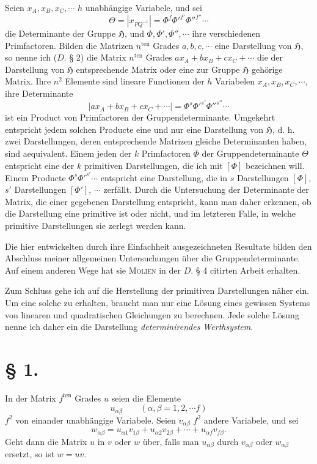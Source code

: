 \documentclass[11pt]{article}
\newcommand{\Hgr}{\mathfrak{H}}
\newcommand{\ten}{\mathrm{ten}}
\begin{document}
Seien $x_A,x_B,x_C,\cdots$ $h$ unabhängige Variabele, und sei
\[
\Theta=|x_{PQ^{-1}}|=\Phi^f{\Phi'}^{f'}{\Phi''}^{f''}\cdots
\]
die Determinante der Gruppe $\Hgr$, und $\Phi,\Phi',\Phi'',\cdots$ ihre verschiedenen Primfactoren. Bilden die Matrizen $n^{\ten}$ Grades $a,b,c,\cdots$ eine Darstellung von $\Hgr$, so nenne ich ($D.$ § 2) die Matrix $n^{\ten}$ Grades $ax_A+bx_B+cx_C+\cdots$ die der Darstellung von $\Hgr$ entsprechende Matrix oder eine zur Gruppe $\Hgr$ gehörige Matrix. Ihre $n^2$ Elemente sind lineare Functionen der $h$ Variabelen $x_A,x_B,x_C,\cdots$, ihre Determinante
\[
|ax_A+bx_B+cx_C+\cdots|=\Phi^s{\Phi'}^{s'}{\Phi''}^{s''}\cdots
\]
ist ein Product von Primfactoren der Gruppendeterminante. Umgekehrt entspricht jedem solchen Producte eine und nur eine Darstellung von $\Hgr$, d. h. zwei Darstellungen, deren entsprechende Matrizen gleiche Determinanten haben, sind aequivalent. Einem jeden der $k$ Primfactoren $\Phi$ der Gruppendeterminante $\Theta$ entspricht eine der $k$ primitiven Darstellungen, die ich mit $[\Phi]$ bezeichnen will. Einem Producte $\Phi^s{\Phi'}^{s'}\cdots$ entspricht eine Darstellung, die in $s$ Darstellungen $[\Phi]$, $s'$ Darstellungen $[\Phi']$, $\cdots$ zerfällt. Durch die Untersuchung der Determinante der Matrix, die einer gegebenen Darstellung entspricht, kann man daher erkennen, ob die Darstellung eine primitive ist oder nicht, und im letzteren Falle, in welche primitive Darstellungen sie zerlegt werden kann.

Die hier entwickelten durch ihre Einfachheit ausgezeichneten Resultate bilden den Abschluss meiner allgemeinen Untersuchungen über die Gruppendeterminante. Auf einem anderen Wege hat sie \textsc{Molien} in der $D.$ § 4 citirten Arbeit erhalten.

Zum Schluss gehe ich auf die Herstellung der primitiven Darstellungen näher ein. Um eine solche zu erhalten, braucht man nur eine Lösung eines gewissen Systems von linearen und quadratischen Gleichungen zu berechnen. Jede solche Lösung nenne ich daher ein die Darstellung \emph{determinirendes Werthsystem}.

\section*{§ 1.}

In der Matrix $f^{\ten}$ Grades $u$ seien die Elemente
\[
u_{\alpha\beta}\qquad(\alpha,\beta=1,2,\cdots f)
\]
$f^2$ von einander unabhängige Variabele. Seien $v_{\alpha\beta}$ $f^2$ andere Variabele, und sei
\[
w_{\alpha\beta}=u_{\alpha1}v_{1\beta}+u_{\alpha2}v_{2\beta}+\cdots+u_{\alpha f}v_{f\beta}.
\]
Geht dann die Matrix $u$ in $v$ oder $w$ über, falls man $u_{\alpha\beta}$ durch $v_{\alpha\beta}$ oder $w_{\alpha\beta}$ ersetzt, so ist $w=uv$.
\end{document}
